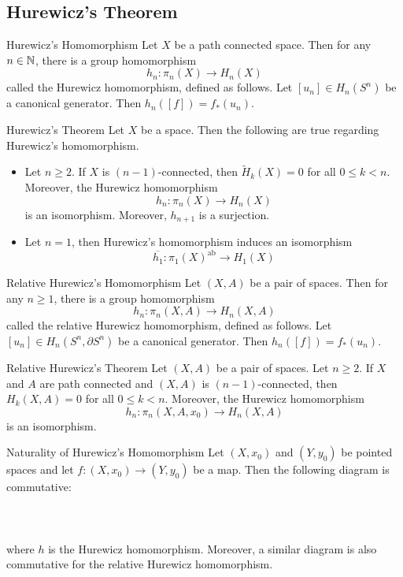 \documentclass[a4paper]{article}
\begin{document}
\subsection{Hurewicz's Theorem}
\begin{thm}{Hurewicz's Homomorphism}{} Let $X$ be a path connected space. Then for any $n\in\mathbb{N}$, there is a group homomorphism $$h_n:\pi_n(X)\to H_n(X)$$ called the Hurewicz homomorphism, defined as follows. Let $[u_n]\in H_n(S^n)$ be a canonical generator. Then $h_n([f])=f_\ast(u_n)$. 
\end{thm}

\begin{thm}{Hurewicz's Theorem}{} Let $X$ be a space. Then the following are true regarding Hurewicz's homomorphism. 
\begin{itemize}
\item Let $n\geq 2$. If $X$ is $(n-1)$-connected, then $\widetilde{H}_k(X)=0$ for all $0\leq k<n$. Moreover, the Hurewicz homomorphism $$h_n:\pi_n(X)\to H_n(X)$$ is an isomorphism. Moreover, $h_{n+1}$ is a surjection. 
\item Let $n=1$, then Hurewicz's homomorphism induces an isomorphism $$\overline{h_1}:\pi_1(X)^\text{ab}\to H_1(X)$$ 
\end{itemize}
\end{thm}

\begin{thm}{Relative Hurewicz's Homomorphism}{} Let $(X,A)$ be a pair of spaces. Then for any $n\geq 1$, there is a group homomorphism $$h_n:\pi_n(X,A)\to H_n(X,A)$$ called the relative Hurewicz homomorphism, defined as follows. Let $[u_n]\in H_n(S^n,\partial S^n)$ be a canonical generator. Then $h_n([f])=f_\ast(u_n)$. 
\end{thm}

\begin{thm}{Relative Hurewicz's Theorem}{} Let $(X,A)$ be a pair of spaces. Let $n\geq 2$. If $X$ and $A$ are path connected and $(X,A)$ is $(n-1)$-connected, then $H_k(X,A)=0$ for all $0\leq k<n$. Moreover, the Hurewicz homomorphism $$h_n:\pi_n(X,A,x_0)\to H_n(X,A)$$ is an isomorphism. 
\end{thm}

\begin{thm}{Naturality of Hurewicz's Homomorphism}{} Let $(X,x_0)$ and $(Y,y_0)$ be pointed spaces and let $f:(X,x_0)\to(Y,y_0)$ be a map. Then the following diagram is commutative: \\~\\
\\~\\
where $h$ is the Hurewicz homomorphism. Moreover, a similar diagram is also commutative for the relative Hurewicz homomorphism. 
\end{thm}
\end{document}
